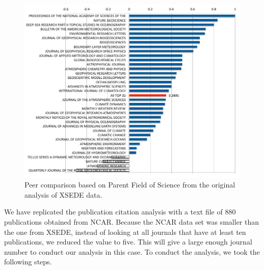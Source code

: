 \documentclass[10pt, conference, compsocconf]{IEEEtran}
\begin{document}
\begin{figure}[h!]
  \centering 
    \includegraphics[width=1.0\columnwidth]{images-new/ncar-c.pdf} 
  \caption{Peer comparison based on Parent Field of Science from the original analysis of XSEDE data.}\label{F:ncar-score}
\end{figure} 

We have replicated the publication citation analysis with a text file of 880 publications obtained from NCAR. Because the NCAR data set was smaller than the one from XSEDE, instead of looking at all journals that have at least ten publications, we reduced the value to five. This will give a large enough journal number to conduct our analysis in this case. To conduct the analysis, we took the following steps.
\end{document}
